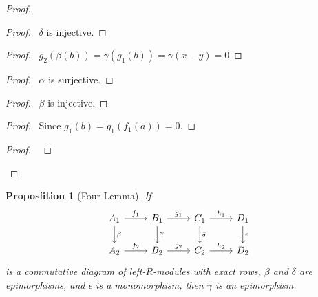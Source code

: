 \documentclass{book}
\let\qed\relax
\newtheorem{prop}{Proposfition}[chapter]
\theoremstyle{definition}
\newcommand{\im}{\ensuremath{\operatorname{im}}}
\begin{document}
\begin{proof}
\pf
	\begin{proof}
		\pf\ $\delta$ is injective.
	\end{proof}
	\step{f}{$x-y \in \im g_1$}
	\begin{proof}
		\pf\ $g_2(\beta(b)) = \gamma(g_1(b)) = \gamma(x-y) = 0$
	\end{proof}
	\step{j}{$\beta(b) \in \im f_2$}
	\begin{proof}
		\pf\ $\alpha$ is surjective.
	\end{proof}
	\begin{proof}
		\pf\ $\beta$ is injective.
	\end{proof}
	\begin{proof}
		\pf\ Since $g_1(b) = g_1(f_1(a)) = 0$.
	\end{proof}
	\begin{proof}
		\pf\ 
	\end{proof}
\qed
\end{proof}

\begin{prop}[Four-Lemma]
If
\[ \begin{tikzcd}
A_1 \arrow[r,"f_1"] \arrow[d,"\beta"] & B_1 \arrow[r,"g_1"] \arrow[d,"\gamma"] & C_1 \arrow[r,"h_1"] \arrow[d,"\delta"] & D_1 \arrow[d,"\epsilon"] \\
A_2 \arrow[r,"f_2"] & B_2 \arrow[r,"g_2"] & C_2 \arrow[r,"h_2"] & D_2
\end{tikzcd} \]
is a commutative diagram of left-$R$-modules with exact rows, $\beta$ and $\delta$ are epimorphisms, and $\epsilon$ is a monomorphism, then $\gamma$ is an epimorphism.
\end{prop}
\end{document}
